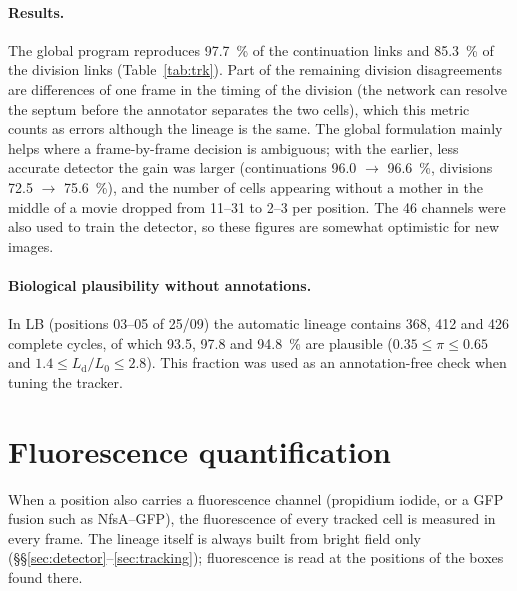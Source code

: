 \documentclass[11pt,a4paper]{article}
\begin{document}
\paragraph{Results.} The global program reproduces \SI{97.7}{\percent} of the continuation links and \SI{85.3}{\percent} of the division links (Table~\ref{tab:trk}). Part of the remaining division disagreements are differences of one frame in the timing of the division (the network can resolve the septum before the annotator separates the two cells), which this metric counts as errors although the lineage is the same. The global formulation mainly helps where a frame-by-frame decision is ambiguous; with the earlier, less accurate detector the gain was larger (continuations \SI{96.0}{} $\to$ \SI{96.6}{\percent}, divisions \SI{72.5}{} $\to$ \SI{75.6}{\percent}), and the number of cells appearing without a mother in the middle of a movie dropped from 11--31 to 2--3 per position. The 46 channels were also used to train the detector, so these figures are somewhat optimistic for new images.

\paragraph{Biological plausibility without annotations.} In LB (positions 03--05 of 25/09) the automatic lineage contains 368, 412 and 426 complete cycles, of which \SI{93.5}{}, \SI{97.8}{} and \SI{94.8}{\percent} are plausible ($0.35\le\pi\le0.65$ and $1.4\le L_{\mathrm d}/L_0\le2.8$). This fraction was used as an annotation-free check when tuning the tracker.

\section{Fluorescence quantification}\label{sec:fluo}

When a position also carries a fluorescence channel (propidium iodide, or a GFP fusion such as NfsA--GFP), the fluorescence of every tracked cell is measured in every frame. The lineage itself is always built from bright field only (\S\S\ref{sec:detector}--\ref{sec:tracking}); fluorescence is read at the positions of the boxes found there.
\end{document}
